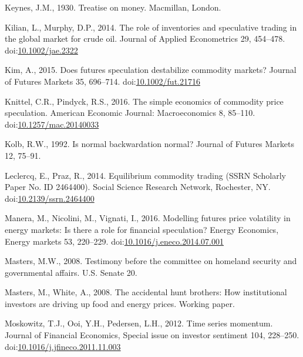 \documentclass[]{elsarticle} %
\begin{document}
\leavevmode\hypertarget{ref-keynes_treatise_1930}{}%
Keynes, J.M., 1930. Treatise on money. Macmillan, London.

\leavevmode\hypertarget{ref-kilian_role_2014}{}%
Kilian, L., Murphy, D.P., 2014. The role of inventories and speculative
trading in the global market for crude oil. Journal of Applied
Econometrics 29, 454--478.
doi:\href{https://doi.org/10.1002/jae.2322}{10.1002/jae.2322}

\leavevmode\hypertarget{ref-kim_does_2015}{}%
Kim, A., 2015. Does futures speculation destabilize commodity markets?
Journal of Futures Markets 35, 696--714.
doi:\href{https://doi.org/10.1002/fut.21716}{10.1002/fut.21716}

\leavevmode\hypertarget{ref-knittel_simple_2016}{}%
Knittel, C.R., Pindyck, R.S., 2016. The simple economics of commodity
price speculation. American Economic Journal: Macroeconomics 8, 85--110.
doi:\href{https://doi.org/10.1257/mac.20140033}{10.1257/mac.20140033}

\leavevmode\hypertarget{ref-kolb_is_1992}{}%
Kolb, R.W., 1992. Is normal backwardation normal? Journal of Futures
Markets 12, 75--91.

\leavevmode\hypertarget{ref-leclercq_equilibrium_2014}{}%
Leclercq, E., Praz, R., 2014. Equilibrium commodity trading (SSRN
Scholarly Paper No. ID 2464400). Social Science Research Network,
Rochester, NY.
doi:\href{https://doi.org/10.2139/ssrn.2464400}{10.2139/ssrn.2464400}

\leavevmode\hypertarget{ref-manera_modelling_2016}{}%
Manera, M., Nicolini, M., Vignati, I., 2016. Modelling futures price
volatility in energy markets: Is there a role for financial speculation?
Energy Economics, Energy markets 53, 220--229.
doi:\href{https://doi.org/10.1016/j.eneco.2014.07.001}{10.1016/j.eneco.2014.07.001}

\leavevmode\hypertarget{ref-masters_testimony_2008}{}%
Masters, M.W., 2008. Testimony before the committee on homeland security
and governmental affairs. U.S. Senate 20.

\leavevmode\hypertarget{ref-masters_accidental_2008}{}%
Masters, M., White, A., 2008. The accidental hunt brothers: How
institutional investors are driving up food and energy prices. Working
paper.

\leavevmode\hypertarget{ref-moskowitz_time_2012}{}%
Moskowitz, T.J., Ooi, Y.H., Pedersen, L.H., 2012. Time series momentum.
Journal of Financial Economics, Special issue on investor sentiment 104,
228--250.
doi:\href{https://doi.org/10.1016/j.jfineco.2011.11.003}{10.1016/j.jfineco.2011.11.003}
\end{document}
